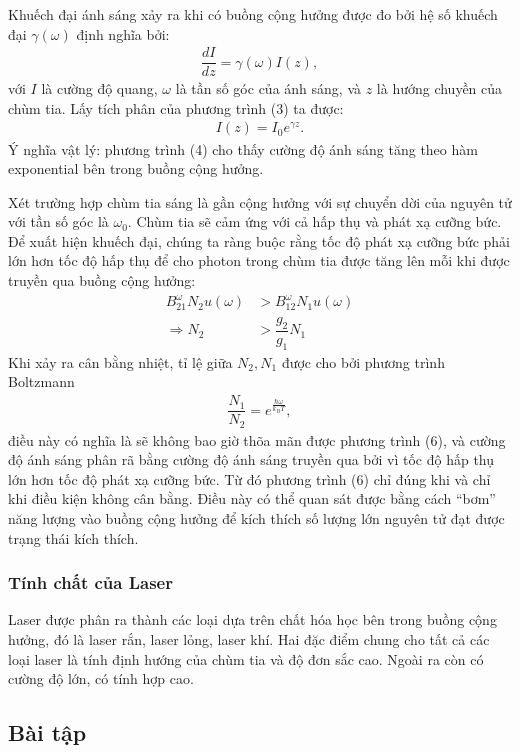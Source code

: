 \documentclass{report}
\newcommand{\f}[2]{\dfrac{#1}{#2}}
\begin{document}
Khuếch đại ánh sáng xảy ra khi có buồng cộng hưởng được đo bởi hệ số khuếch đại $\gamma(\omega)$ định nghĩa bởi:
\begin{align}
	\f{d I}{d z} = \gamma(\omega) I(z),
\end{align}
với	$I$ là cường độ quang, $\omega$ là tần số góc của ánh sáng, và $z$ là hướng chuyền của chùm tia. Lấy tích phân của phương trình (3) ta được:
\begin{align}
	I(z) = I_0 e^{\gamma z}.
\end{align}
Ý nghĩa vật lý: phương trình (4) cho thấy cường độ ánh sáng tăng theo hàm exponential bên trong buồng cộng hưởng.

Xét trường hợp chùm tia sáng là gần cộng hưởng với sự chuyển dời của nguyên tử với tần số góc là $\omega_0$. Chùm tia sẽ cảm ứng với cả hấp thụ và phát xạ cưỡng bức. Để xuất hiện khuếch đại, chúng ta ràng buộc rằng tốc độ phát xạ cưỡng bức phải lớn hơn tốc độ hấp thụ để cho photon trong chùm tia được tăng lên mỗi khi được truyền qua buồng cộng hưởng:
\begin{align}
	B_{21}^{\omega} N_2 u(\omega) & > B_{12}^{\omega} N_1 u(\omega) \\
	\Rightarrow N_2               & > \f{g_2}{g_1}N_1
\end{align}
Khi xảy ra cân bằng nhiệt, tỉ lệ giữa $N_2,N_1$ được cho bởi phương trình Boltzmann
\begin{align*}
	\f{N_1}{N_2} = e^{\frac{\hbar \omega}{k_B T}},
\end{align*}
điều này có nghĩa là sẽ không bao giờ thõa mãn được phương trình (6), và cường độ ánh sáng phân rã bằng cường độ ánh sáng truyền qua bởi vì tốc độ hấp thụ	lớn hơn tốc độ phát xạ cưỡng bức. Từ đó phương trình (6) chỉ đúng khi và chỉ khi điều kiện không cân bằng. Điều này có thể quan sát được bằng cách ``bơm'' năng lượng vào buồng cộng hưởng để kích thích số lượng lớn nguyên tử đạt được trạng thái kích thích.

\subsubsection{Tính chất của Laser}
Laser được phân ra thành các loại dựa trên chất hóa học bên trong buồng cộng hưởng, đó là laser rắn, laser lỏng, laser khí. Hai đặc điểm chung cho tất cả các loại laser là tính định hướng của chùm tia và độ đơn sắc cao. Ngoài ra còn có cường độ lớn, có tính hợp cao.

\subsection{Bài tập}
\end{document}
